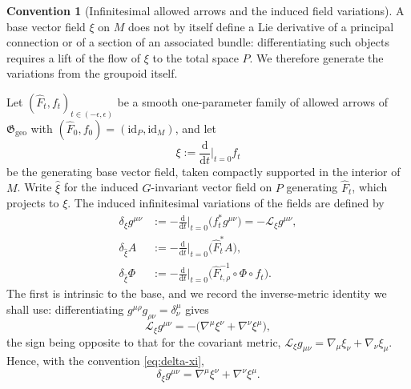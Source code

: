 \documentclass[11pt,a4paper]{article}
\theoremstyle{plain}
\theoremstyle{definition}
\newtheorem{convention}[theorem]{Convention}
\theoremstyle{remark}
\newcommand{\Ggeo}{\mathfrak{G}_{\mathrm{geo}}}
\newcommand{\id}{\mathrm{id}}
\newcommand{\Lie}{\mathcal{L}}
\begin{document}
\begin{convention}[Infinitesimal allowed arrows and the induced field variations]
\label{conv:lie}
A base vector field $\xi$ on $M$ does not by itself define a Lie derivative of a principal
connection or of a section of an associated bundle: differentiating such objects requires a lift of
the flow of $\xi$ to the total space $P$. We therefore generate the variations from the groupoid
itself.

Let $(\hat F_t,f_t)_{t\in(-\epsilon,\epsilon)}$ be a smooth one-parameter family of allowed arrows
of $\Ggeo$ with $(\hat F_0,f_0)=(\id_P,\id_M)$, and let
\[
\xi:=\frac{\mathrm{d}}{\mathrm{d}t}\Big|_{t=0} f_t
\]
be the generating base vector field, taken compactly supported in the interior of $M$. Write
$\hat\xi$ for the induced $G$-invariant vector field on $P$ generating $\hat F_t$, which projects to
$\xi$. The induced infinitesimal variations of the fields are defined by
\begin{equation}
\label{eq:delta-xi}
\begin{aligned}
\delta_\xi g^{\mu\nu}
&:=-\frac{\mathrm{d}}{\mathrm{d}t}\Big|_{t=0}\bigl(f_t^{*}g^{\mu\nu}\bigr)
=-\Lie_\xi g^{\mu\nu},
\\[0.35em]
\delta_{\hat\xi} A
&:=-\frac{\mathrm{d}}{\mathrm{d}t}\Big|_{t=0}\bigl(\hat F_t^{*}A\bigr),
\\[0.35em]
\delta_{\hat\xi}\Phi
&:=-\frac{\mathrm{d}}{\mathrm{d}t}\Big|_{t=0}
\bigl(\hat F_{t,\rho}^{-1}\circ\Phi\circ f_t\bigr).
\end{aligned}
\end{equation}
The first is intrinsic to the base, and we record the inverse-metric identity we shall use:
differentiating $g^{\mu\rho}g_{\rho\nu}=\delta^{\mu}_{\nu}$ gives
\begin{equation}
\label{eq:lie-inverse}
\Lie_\xi g^{\mu\nu}=-\bigl(\nabla^{\mu}\xi^{\nu}+\nabla^{\nu}\xi^{\mu}\bigr),
\end{equation}
the sign being opposite to that for the covariant metric,
$\Lie_\xi g_{\mu\nu}=\nabla_\mu\xi_\nu+\nabla_\nu\xi_\mu$. Hence, with the convention
\eqref{eq:delta-xi},
\begin{equation}
\label{eq:delta-xi-metric}
\delta_\xi g^{\mu\nu}=\nabla^{\mu}\xi^{\nu}+\nabla^{\nu}\xi^{\mu} .
\end{equation}


\end{convention}
\end{document}
